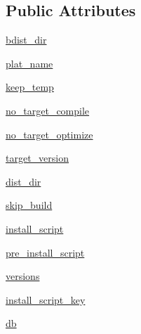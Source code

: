 \subsection*{Public Attributes}
\begin{DoxyCompactItemize}
\item 
\hyperlink{classsetuptools_1_1__distutils_1_1command_1_1bdist__msi_1_1bdist__msi_afd14adbac42e5506801e0907eb5224c6}{bdist\+\_\+dir}
\item 
\hyperlink{classsetuptools_1_1__distutils_1_1command_1_1bdist__msi_1_1bdist__msi_a8f7a29fbba086d74d2b8b206afbbc95a}{plat\+\_\+name}
\item 
\hyperlink{classsetuptools_1_1__distutils_1_1command_1_1bdist__msi_1_1bdist__msi_ae41682bb0eb227ee5bee72433f8d136c}{keep\+\_\+temp}
\item 
\hyperlink{classsetuptools_1_1__distutils_1_1command_1_1bdist__msi_1_1bdist__msi_a62950f28dd3acdad5719fd80be2989a3}{no\+\_\+target\+\_\+compile}
\item 
\hyperlink{classsetuptools_1_1__distutils_1_1command_1_1bdist__msi_1_1bdist__msi_ac072d6394113110a31ee52991d65f49b}{no\+\_\+target\+\_\+optimize}
\item 
\hyperlink{classsetuptools_1_1__distutils_1_1command_1_1bdist__msi_1_1bdist__msi_a09f3823f484ea550d0b7134976f4150f}{target\+\_\+version}
\item 
\hyperlink{classsetuptools_1_1__distutils_1_1command_1_1bdist__msi_1_1bdist__msi_aa9cc682e851b988506921cc36459abe4}{dist\+\_\+dir}
\item 
\hyperlink{classsetuptools_1_1__distutils_1_1command_1_1bdist__msi_1_1bdist__msi_a5599b7f01ef005288cf9b6526d45ac43}{skip\+\_\+build}
\item 
\hyperlink{classsetuptools_1_1__distutils_1_1command_1_1bdist__msi_1_1bdist__msi_a31e5768e79030600265eb064c2f7b1c5}{install\+\_\+script}
\item 
\hyperlink{classsetuptools_1_1__distutils_1_1command_1_1bdist__msi_1_1bdist__msi_ad0ae3f11f4afeede0da146de57ed19b7}{pre\+\_\+install\+\_\+script}
\item 
\hyperlink{classsetuptools_1_1__distutils_1_1command_1_1bdist__msi_1_1bdist__msi_af96aae7d18870fe33fe73c08bcdcda96}{versions}
\item 
\hyperlink{classsetuptools_1_1__distutils_1_1command_1_1bdist__msi_1_1bdist__msi_a1bd51d3a9077002046413b0689415cb5}{install\+\_\+script\+\_\+key}
\item 
\hyperlink{classsetuptools_1_1__distutils_1_1command_1_1bdist__msi_1_1bdist__msi_ad66f54ba662b9a527a57c20561efc5e9}{db}
\end{DoxyCompactItemize}

